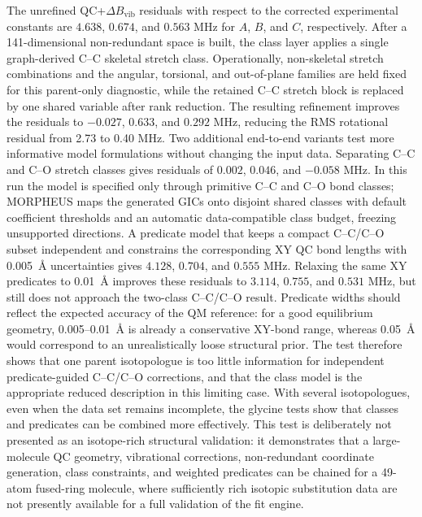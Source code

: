 \documentclass[aip,jcp,reprint,longbibliography,floatfix]{revtex4-2}
\begin{document}
The unrefined QC+$\Delta B_\mathrm{vib}$ residuals with respect to the corrected
experimental constants are $4.638$, $0.674$, and $0.563$ MHz for $A$, $B$, and
$C$, respectively. After a 141-dimensional non-redundant space is built, the
class layer applies a single graph-derived C--C skeletal stretch class.
Operationally, non-skeletal stretch combinations and the angular, torsional,
and out-of-plane families are held fixed for this parent-only diagnostic, while
the retained C--C stretch block is replaced by one shared variable after rank
reduction. The resulting refinement improves the residuals to $-0.027$,
$0.633$, and $0.292$ MHz, reducing the RMS rotational residual from 2.73 to
0.40 MHz. Two additional end-to-end variants test more informative model
formulations without changing the input data. Separating C--C and C--O stretch
classes gives residuals of $0.002$, $0.046$, and $-0.058$ MHz. In this run the
model is specified only through primitive C--C and C--O bond classes; MORPHEUS
maps the generated GICs onto disjoint shared classes with default coefficient
thresholds and an automatic data-compatible class budget, freezing unsupported
directions.
A predicate model that keeps a compact C--C/C--O subset independent and
constrains the corresponding XY QC bond lengths with 0.005~\AA{} uncertainties
gives $4.128$, $0.704$, and $0.555$ MHz. Relaxing the same XY predicates to
0.01~\AA{} improves these residuals to $3.114$, $0.755$, and $0.531$ MHz, but
still does not approach the two-class C--C/C--O result. Predicate widths should
reflect the expected accuracy of the QM reference: for a good equilibrium
geometry, 0.005--0.01~\AA{} is already a conservative XY-bond range, whereas
0.05~\AA{} would correspond to an unrealistically loose structural prior. The
test therefore shows that one parent isotopologue is too little information for
independent predicate-guided C--C/C--O corrections, and that the class model is
the appropriate reduced description in this limiting case. With several
isotopologues, even when the data set remains incomplete, the glycine tests show
that classes and predicates can be combined more effectively.
This test is deliberately not presented as an isotope-rich
structural validation: it demonstrates that a large-molecule QC geometry,
vibrational corrections, non-redundant coordinate generation, class constraints,
and weighted predicates can be chained for a 49-atom fused-ring molecule, where
sufficiently rich isotopic substitution data are not presently available for a
full validation of the fit engine.
\end{document}
